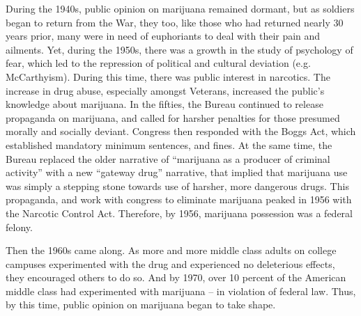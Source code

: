 During the 1940s, public opinion on marijuana remained dormant, but as soldiers began to return from the War, they too, like those who had returned nearly 30 years prior, many were in need of euphoriants to deal with their pain and ailments. Yet, during the 1950s, there was a growth in the study of psychology of fear, which led to the repression of political and cultural deviation (e.g. McCarthyism). During this time, there was public interest in narcotics. The increase in drug abuse, especially amongst Veterans, increased the public's knowledge about marijuana. In the fifties, the Bureau continued to release propaganda on marijuana, and called for harsher penalties for those presumed morally and socially deviant. Congress then responded with the Boggs Act, which established mandatory minimum sentences, and fines. At the same time, the Bureau replaced the older narrative of ``marijuana as a producer of criminal activity'' with a new ``gateway drug'' narrative, that implied that marijuana use was simply a stepping stone towards use of harsher, more dangerous drugs. This propaganda, and work with congress to eliminate marijuana peaked in 1956 with the Narcotic Control Act. Therefore, by 1956, marijuana possession was a federal felony. 

Then the 1960s came along. As more and more middle class adults on college campuses experimented with the drug and experienced no deleterious effects, they encouraged others to do so. And by 1970, over 10 percent of the American middle class had experimented with marijuana -- in violation of federal law. Thus, by this time, public opinion on marijuana began to take shape. 

